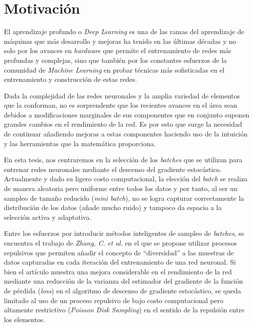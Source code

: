 \section{Motivación}

El aprendizaje profundo o \textit{Deep Learning} es una de las ramas del aprendizaje de máquinas que más desarrollo y mejoras ha tenido en las últimas décadas y no solo por los avances en \textit{hardware} que permite el entrenamiento de redes más profundas y complejas, sino que también por los constantes esfuerzos de la comunidad de \textit{Machine Learning} en probar técnicas más sofisticadas en el entrenamiento y construcción de estas redes.

\vspace{0.2cm}

Dada la complejidad de las redes neuronales y la amplia variedad de elementos que la conforman, no es sorprendente que los recientes avances en el área sean debidos a modificaciones marginales de sus componentes que en conjunto suponen grandes cambios en el rendimiento de la red. Es por esto que surge la necesidad de continuar añadiendo mejoras a estas componentes haciendo uso de la intuición y las herramientas que la matemática proporciona. 

\vspace{0.2cm}

En esta tesis, nos centraremos en la selección de los \textit{batches} que se utilizan para entrenar redes neuronales mediante el descenso del gradiente estocástico. Actualmente y dado su ligero costo computacional, la elección del \textit{batch} se realiza de manera aleatoria pero uniforme entre todos los datos y por tanto, al ser un sampleo de tamaño reducido (\textit{mini batch}), no se logra capturar correctamente la distribución de los datos (añade mucho ruido) y tampoco da espacio a la selección activa y adaptativa. 

\vspace{0.2cm}

Entre los esfuerzos por introducir métodos inteligentes de sampleo de \textit{batches}, se encuentra el trabajo de \textit{Zhang, C. et al.} \cite{https://doi.org/10.48550/arxiv.1804.02772} en el que se propone utilizar procesos repulsivos que permiten añadir el concepto de ``diversidad'' a las muestras de datos capturadas en cada iteración del entrenamiento de una red neuronal. Si bien el artículo muestra una mejora considerable en el rendimiento de la red mediante una reducción de la varianza del estimador del gradiente de la función de pérdida (\textit{loss}) en el algoritmo de descenso de gradiente estocástico, se queda limitado al uso de un proceso repulsivo de bajo costo computacional pero altamente restrictivo (\textit{Poisson Disk Sampling}) en el sentido de la repulsión entre los elementos.


